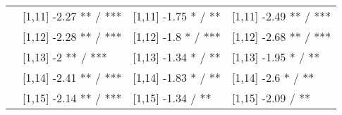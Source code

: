 \begin{table}
\begin{tabular}[t]{llll}
 & {}[1,11] -2.27 ** / *** & {}[1,11] -1.75 * / ** & {}[1,11] -2.49 ** / ***\\
 & {}[1,12] -2.28 ** / *** & {}[1,12] -1.8 * / *** & {}[1,12] -2.68 ** / ***\\
\addlinespace
 & {}[1,13] -2 ** / *** & {}[1,13] -1.34 * / ** & {}[1,13] -1.95 * / **\\
 & {}[1,14] -2.41 ** / *** & {}[1,14] -1.83 * / ** & {}[1,14] -2.6 * / **\\
 & {}[1,15] -2.14 ** / *** & {}[1,15] -1.34  / ** & {}[1,15] -2.09  / **\\
\bottomrule
\end{tabular}
\end{table}

